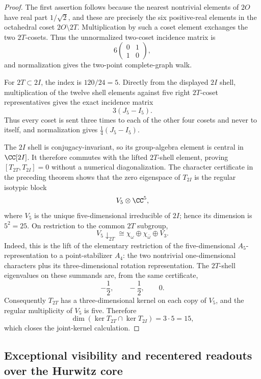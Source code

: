 \documentclass[11pt]{article}
\begin{document}
\begin{proof}
The first assertion follows because the nearest nontrivial elements of \(2O\) have
real part \(1/\sqrt2\), and these are precisely the six positive-real elements in
the octahedral coset \(2O\setminus2T\).  Multiplication by such a coset element
exchanges the two \(2T\)-cosets.  Thus the unnormalized two-coset incidence
matrix is
\[
  6\begin{pmatrix}0&1\\1&0\end{pmatrix},
\]
and normalization gives the two-point complete-graph walk.

For \(2T\subset2I\), the index is \(120/24=5\).  Directly from the displayed
\(2I\) shell, multiplication of the twelve shell elements against five right
\(2T\)-coset representatives gives the exact incidence matrix
\[
  3(J_5-I_5).
\]
Thus every coset is sent three times to each of the other four cosets and
never to itself, and normalization gives
\(\frac14(J_5-I_5)\).

The \(2I\) shell is conjugacy-invariant, so its group-algebra element is
central in \(\CC[2I]\).  It therefore commutes with the lifted
\(2T\)-shell element, proving \([T_{2T},T_{2I}]=0\) without a numerical
diagonalization.  The character certificate in the preceding theorem shows
that the zero eigenspace of \(T_{2I}\) is the regular isotypic block
\[
    V_5\otimes\CC^5,
\]
where \(V_5\) is the unique five-dimensional irreducible of \(2I\); hence
its dimension is \(5^2=25\).  On restriction to the common \(2T\) subgroup,
\[
    V_5\!\downarrow_{2T}
    \cong \chi_\omega\oplus\chi_{\bar\omega}\oplus V_3.
\]
Indeed, this is the lift of the elementary restriction of the
five-dimensional \(A_5\)-representation to a point-stabilizer \(A_4\):
the two nontrivial one-dimensional characters plus its three-dimensional
rotation representation.  The \(2T\)-shell eigenvalues on these summands are,
from the same certificate,
\[
    -\frac12,\qquad-\frac12,\qquad0.
\]
Consequently \(T_{2T}\) has a three-dimensional kernel on each copy of
\(V_5\), and the regular multiplicity of \(V_5\) is five.  Therefore
\[
    \dim(\ker T_{2T}\cap\ker T_{2I})=3\cdot5=15,
\]
which closes the joint-kernel calculation.
\end{proof}

\subsection{Exceptional visibility and recentered readouts over the Hurwitz core}
\label{p1:subsec:exceptional-core-visibility}
\end{document}

